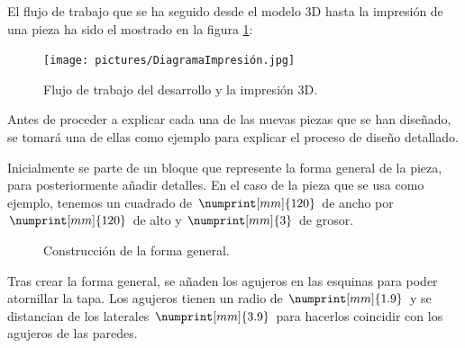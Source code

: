 El flujo de trabajo que se ha seguido desde el modelo 3D hasta la impresión de una pieza ha sido el mostrado en la figura \ref{fig:flujo_3d}:

\begin{figure}[H]
    \centering
    \texttt{[image: pictures/DiagramaImpresión.jpg]}
    \caption{Flujo de trabajo del desarrollo y la impresión 3D.}
    \label{fig:flujo_3d}
\end{figure}

Antes de proceder a explicar cada una de las nuevas piezas que se han diseñado, se tomará una de ellas como ejemplo para explicar el proceso de diseño detallado.

Inicialmente se parte de un bloque que represente la forma general de la pieza, para posteriormente añadir detalles. En el caso de la pieza que se usa como ejemplo, tenemos un cuadrado de $\numprint[mm]{120}$ de ancho por $\numprint[mm]{120}$ de alto y $\numprint[mm]{3}$ de grosor.

\begin{figure}[H]
    \centering
    \hfill
    \caption{Construcción de la forma general.}
    \label{fig:forma_general_tapa_superior}
\end{figure}

Tras crear la forma general, se añaden los agujeros en las esquinas para poder atornillar la tapa. Los agujeros tienen un radio de $\numprint[mm]{1.9}$ y se distancian de los laterales $\numprint[mm]{3.9}$ para hacerlos coincidir con los agujeros de las paredes.

